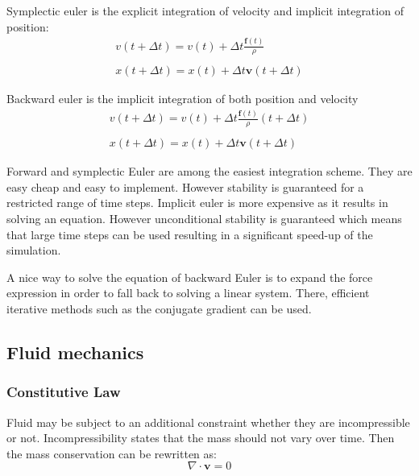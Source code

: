 Symplectic euler is the explicit integration of velocity and implicit integration of position:
\begin{equation}
\label{eq:symplecticEuler}
\begin{array}{l}
\displaystyle v(t+\Delta t) = v(t) + \Delta t \frac{\mathbf{f}(t)}{\rho} \\ \\
\displaystyle x(t+\Delta t) = x(t) + \Delta t \mathbf{v}(t+\Delta t)
\end{array}
\end{equation}

Backward euler is the implicit integration of both position and velocity
\begin{equation}
\label{eq:backwardEuler}
\begin{array}{ll}
\displaystyle v(t+\Delta t) = v(t) + \Delta t \frac{\mathbf{f}(t)}{\rho}(t+\Delta t) \\ \\
\displaystyle x(t+\Delta t) = x(t) + \Delta t \mathbf{v}(t+\Delta t)
\end{array}
\end{equation}

Forward and symplectic Euler are among the easiest integration scheme. They are easy cheap and easy to implement. However stability is guaranteed for a restricted range of time steps. Implicit euler is more expensive as it results in solving an equation. However unconditional stability is guaranteed which means that large time steps can be used resulting in a significant speed-up of the simulation. 

A nice way to solve the equation of backward Euler is to expand the force expression in order to fall back to solving a linear system. There, efficient iterative methods such as the conjugate gradient can be used.

\subsection{Fluid mechanics}

\subsubsection{Constitutive Law}

Fluid may be subject to an additional constraint whether they are incompressible or not. Incompressibility states that the mass should not vary over time. Then the mass conservation can be rewritten as:
\begin{equation}
\nabla \cdot \mathbf{v} = 0
\end{equation}

